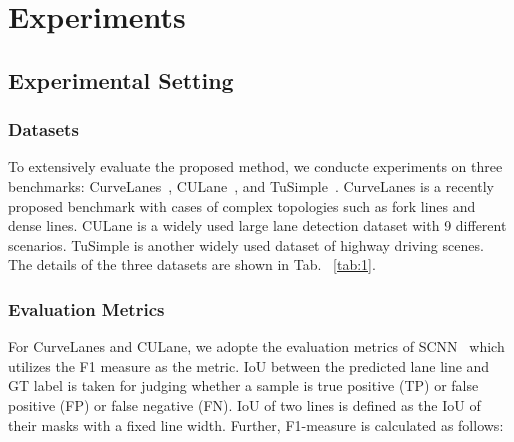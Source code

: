 \documentclass[10pt,twocolumn,letterpaper]{article}
\begin{document}
\section{Experiments}
\subsection{Experimental Setting}
\subsubsection{Datasets}
To extensively evaluate the proposed method, we conducte experiments on three benchmarks: CurveLanes~\cite{li2020curvelane}, CULane~\cite{pan2018spatial}, and TuSimple~\cite{c.elmohamed}. CurveLanes is a recently proposed benchmark with cases of complex topologies such as fork lines and dense lines. CULane is a widely used large lane detection dataset with 9 different scenarios. TuSimple is another widely used dataset of highway driving scenes. The details of the three datasets are shown in Tab. ~\ref{tab:1}.
\begin{table}[h]
\begin{center}
\end{center}
\caption{Details of three datasets.}
\label{tab:1}
\end{table}

\subsubsection{Evaluation Metrics}
For CurveLanes and CULane, we adopte the evaluation metrics of SCNN~\cite{pan2018spatial} which utilizes the F1 measure as the metric. IoU between the predicted lane line and GT label is taken for judging whether a sample is true positive (TP) or false positive (FP) or false negative (FN). IoU of two lines is defined as the IoU of their masks with a fixed line width. Further, F1-measure is calculated as follows:
\end{document}
